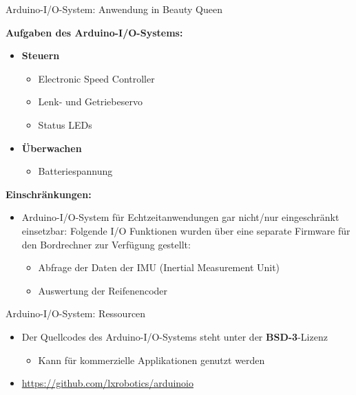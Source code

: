 \documentclass{beamer}
\begin{document}
\begin{frame}{Arduino-I/O-System: Anwendung in Beauty Queen}
\begin{large}\textbf{Aufgaben des Arduino-I/O-Systems:}\end{large}
 \begin{itemize}
  \item \textbf{Steuern}
  \begin{itemize}
   \item Electronic Speed Controller
   \item Lenk- und Getriebeservo
   \item Status LEDs
  \end{itemize}
 \end{itemize}
 \begin{itemize}
  \item \textbf{\"Uberwachen}
  \begin{itemize}
   \item Batteriespannung
  \end{itemize}
 \end{itemize}
\begin{large}\textbf{Einschr\"ankungen:}\end{large}
\begin{itemize}
 \item Arduino-I/O-System f\"ur Echtzeitanwendungen gar nicht/nur eingeschr\"ankt einsetzbar: Folgende I/O Funktionen wurden \"uber eine separate Firmware f\"ur den Bordrechner zur Verf\"ugung gestellt:
 \begin{itemize}
  \item Abfrage der Daten der IMU (Inertial Measurement Unit)
  \item Auswertung der Reifenencoder
 \end{itemize}
\end{itemize}
\end{frame}
\begin{frame}{Arduino-I/O-System: Ressourcen}
	\begin{itemize}
		\item Der Quellcodes des Arduino-I/O-Systems steht unter der \textbf{BSD-3}-Lizenz
		\begin{itemize}
			\item Kann f\"ur kommerzielle Applikationen genutzt werden
		\end{itemize}
	\end{itemize}
	\begin{itemize}
		\item \url{https://github.com/lxrobotics/arduinoio}
	\end{itemize}
\end{frame}
\end{document}
